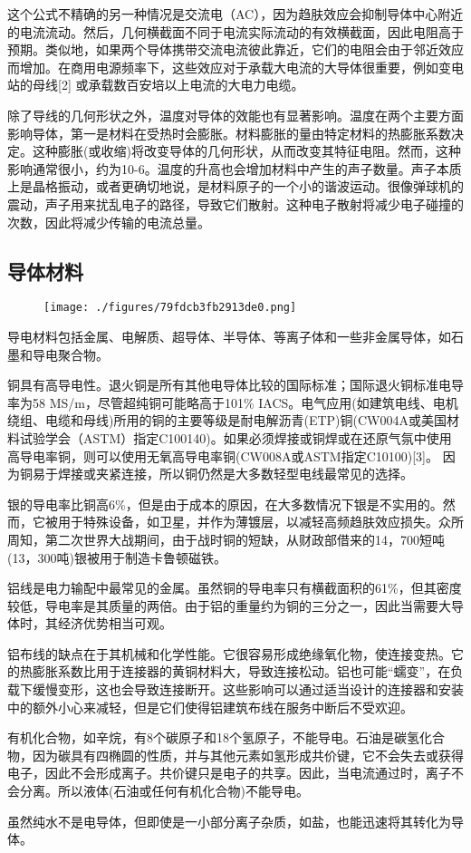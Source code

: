 这个公式不精确的另一种情况是交流电（AC），因为趋肤效应会抑制导体中心附近的电流流动。然后，几何横截面不同于电流实际流动的有效横截面，因此电阻高于预期。类似地，如果两个导体携带交流电流彼此靠近，它们的电阻会由于邻近效应而增加。在商用电源频率下，这些效应对于承载大电流的大导体很重要，例如变电站的母线[2] 或承载数百安培以上电流的大电力电缆。

除了导线的几何形状之外，温度对导体的效能也有显著影响。温度在两个主要方面影响导体，第一是材料在受热时会膨胀。材料膨胀的量由特定材料的热膨胀系数决定。这种膨胀(或收缩)将改变导体的几何形状，从而改变其特征电阻。然而，这种影响通常很小，约为10-6。温度的升高也会增加材料中产生的声子数量。声子本质上是晶格振动，或者更确切地说，是材料原子的一个小的谐波运动。很像弹球机的震动，声子用来扰乱电子的路径，导致它们散射。这种电子散射将减少电子碰撞的次数，因此将减少传输的电流总量。

\subsection{导体材料}
\begin{figure}[ht]
\centering
\texttt{[image: ./figures/79fdcb3fb2913de0.png]}
\caption\label{fig_DDT_2}
\end{figure}

导电材料包括金属、电解质、超导体、半导体、等离子体和一些非金属导体，如石墨和导电聚合物。

铜具有高导电性。退火铜是所有其他电导体比较的国际标准；国际退火铜标准电导率为58 MS/m，尽管超纯铜可能略高于101\% IACS。电气应用(如建筑电线、电机绕组、电缆和母线)所用的铜的主要等级是耐电解沥青(ETP)铜(CW004A或美国材料试验学会（ASTM）指定C100140)。如果必须焊接或铜焊或在还原气氛中使用高导电率铜，则可以使用无氧高导电率铜(CW008A或ASTM指定C10100)[3]。 因为铜易于焊接或夹紧连接，所以铜仍然是大多数轻型电线最常见的选择。

银的导电率比铜高6\%，但是由于成本的原因，在大多数情况下银是不实用的。然而，它被用于特殊设备，如卫星，并作为薄镀层，以减轻高频趋肤效应损失。众所周知，第二次世界大战期间，由于战时铜的短缺，从财政部借来的14，700短吨(13，300吨)银被用于制造卡鲁顿磁铁。

铝线是电力输配中最常见的金属。虽然铜的导电率只有横截面积的61\%，但其密度较低，导电率是其质量的两倍。由于铝的重量约为铜的三分之一，因此当需要大导体时，其经济优势相当可观。

铝布线的缺点在于其机械和化学性能。它很容易形成绝缘氧化物，使连接变热。它的热膨胀系数比用于连接器的黄铜材料大，导致连接松动。铝也可能“蠕变”，在负载下缓慢变形，这也会导致连接断开。这些影响可以通过适当设计的连接器和安装中的额外小心来减轻，但是它们使得铝建筑布线在服务中断后不受欢迎。

有机化合物，如辛烷，有8个碳原子和18个氢原子，不能导电。石油是碳氢化合物，因为碳具有四椭圆的性质，并与其他元素如氢形成共价键，它不会失去或获得电子，因此不会形成离子。共价键只是电子的共享。因此，当电流通过时，离子不会分离。所以液体(石油或任何有机化合物)不能导电。

虽然纯水不是电导体，但即使是一小部分离子杂质，如盐，也能迅速将其转化为导体。